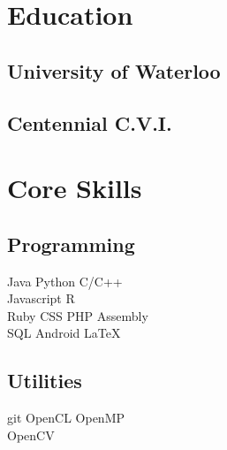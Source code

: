 \documentclass[letterpaper]{deedy-resume} %
\begin{document}
\begin{minipage}[t]{0.33\textwidth} %


\section{Education} 

\subsection{University of Waterloo}


\sectionspace %


\subsection{Centennial C.V.I.}



\section{Core Skills}

\subsection{Programming}

Java \textbullet{} Python \textbullet{} C/C++ \\
Javascript \textbullet{} R \\ 
Ruby \textbullet{} CSS \textbullet{} PHP \textbullet{} Assembly \\
SQL \textbullet{} Android \textbullet{} \LaTeX\

\sectionspace %

\subsection{Utilities}
git \textbullet{} OpenCL \textbullet{} OpenMP \\
OpenCV


\end{minipage}
\end{document}
